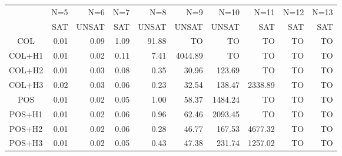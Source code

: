 \begin{tabular}[c]{c|r|r|r|r|r|r|r|r|r}\tiny
               & N=5  & N=6  & N=7  & N=8   &    N=9 &   N=10 &    N=11& N=12& N=13 \\
               & SAT  & UNSAT& SAT  & UNSAT &  UNSAT &  UNSAT &    SAT & SAT & SAT \\\hline
    COL        & 0.01 & 0.09 & 1.09 & 91.88 &      TO&      TO&      TO&   TO& TO \\
    COL+H1     & 0.01 & 0.02 & 0.11 &  7.41 & 4044.89&      TO&      TO&   TO& TO \\
    COL+H2     & 0.01 & 0.03 & 0.08 &  0.35 &   \alert{30.96}&  \alert{123.69}&      TO&   TO& TO \\
    COL+H3     & 0.02 & 0.03 & 0.06 &  \alert{0.23} &   32.54&  138.47& 2338.89&   TO& TO \\
    POS        & 0.01 & 0.02 & \alert{0.05} &  1.00 &   58.37& 1484.24&      TO&   TO& TO \\
    POS+H1     & 0.01 & 0.02 & 0.06 &  0.96 &   62.46& 2093.45&      TO&   TO& TO \\
    POS+H2     & 0.01 & 0.02 & 0.06 &  0.28 &   46.77&  167.53& 4677.32&   TO& TO \\
    POS+H3     & 0.01 & 0.02 & \alert{0.05} &  0.43 &   47.38&  231.74& \alert{1257.02}&   TO& TO 
\end{tabular}
